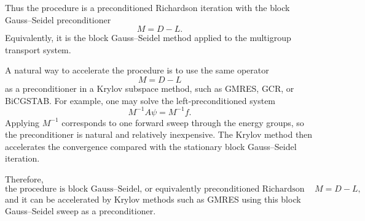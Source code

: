 \documentclass{ctexart}
\begin{document}
\begin{solution}
  Thus the procedure is a preconditioned Richardson iteration with the
  block Gauss--Seidel preconditioner
  \[
    M=D-L.
  \]
  Equivalently, it is the block Gauss--Seidel method applied to the
  multigroup transport system.

  A natural way to accelerate the procedure is to use the same operator
  \[
    M=D-L
  \]
  as a preconditioner in a Krylov subspace method, such as GMRES, GCR, or
  BiCGSTAB.  For example, one may solve the left-preconditioned system
  \[
    M^{-1}A\psi=M^{-1}f.
  \]
  Applying $M^{-1}$ corresponds to one forward sweep through the energy
  groups, so the preconditioner is natural and relatively inexpensive.
  The Krylov method then accelerates the convergence compared with the
  stationary block Gauss--Seidel iteration.

  Therefore,
  \[
    \boxed{
      \text{the procedure is block Gauss--Seidel, or equivalently
      preconditioned Richardson with } M=D-L,
    }
  \]
  and it can be accelerated by Krylov methods such as GMRES using this
  block Gauss--Seidel sweep as a preconditioner.
\end{solution}
\end{document}
